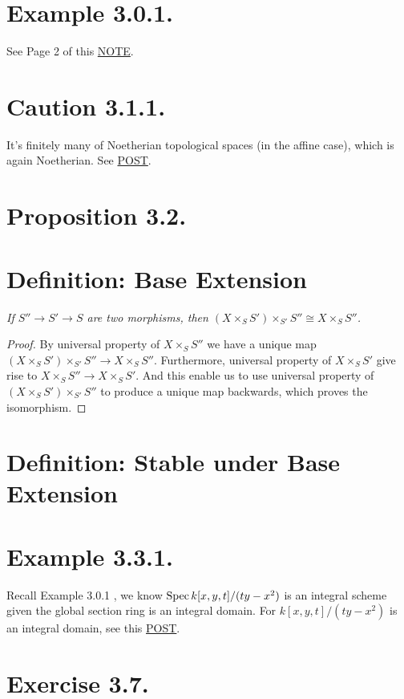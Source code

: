 \section{Example 3.0.1.}\label{Hart Chap 2 Example 3.0.1.}

See Page 2 of this \href{https://ocw.mit.edu/courses/18-726-algebraic-geometry-spring-2009/3723a99e97b581828fd782b9ffd83921_MIT18_726s09_lec11_more_schemes.pdf}{NOTE}.

\section{Caution 3.1.1.}

It's finitely many of Noetherian topological spaces (in the affine case), which is again Noetherian. See \href{https://math.stackexchange.com/questions/3388747/on-the-definition-of-noetherian-scheme}{POST}.

\section{Proposition 3.2.}

\section{Definition: Base Extension}

\textit{If $S''\to S'\to S$ are two morphisms, then $(X\times_S S')\times _{S'}S''\cong X\times_{S}S''$.}
\begin{proof}
By universal property of $X\times_S S''$ we have a unique map $(X\times_S S')\times _{S'}S''\to X\times_{S}S''$. Furthermore, universal property of $X\times_S S'$ give rise to $X\times_S S''\to X\times_S S'$. And this enable us to use universal property of $(X\times_S S')\times_{S'}S''$ to produce a unique map backwards, which proves the isomorphism.
\end{proof}

\section{Definition: Stable under Base Extension}

\section{Example 3.3.1.}

Recall Example 3.0.1 , we know $\operatorname{Spec} k[x,y,t]/(ty-x^2)$ is an integral scheme given the global section ring is an integral domain.
For $k[x,y,t]/(ty-x^2)$ is an integral domain, see this \href{https://math.stackexchange.com/questions/3320367/mathbbcx-y-z-xy-z2-is-not-a-field}{POST}. 


\section{Exercise 3.7.}

\textit{}